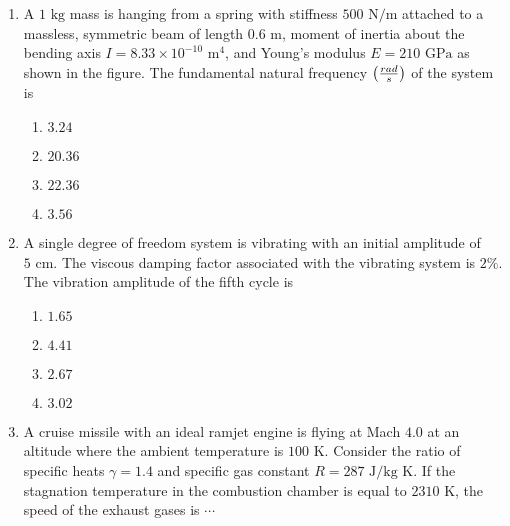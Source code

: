 \documentclass[journal,12pt,twocolumn]{IEEEtran}
\theoremstyle{remark}
\begin{document}
\begin{enumerate}[start=40]
    \item A $1 \text{ kg}$ mass is hanging from a spring with stiffness $500 \text{ N/m}$ attached to a massless, symmetric beam of length $0.6 \text{ m}$, moment of inertia about the bending axis $I = 8.33 \times 10^{-10} \text{ m}^4$, and Young's modulus $E = 210 \text{ GPa}$ as shown in the figure. The fundamental natural frequency $\left(\frac{rad}{s}\right)$ of the system is


	    \begin{enumerate}
        \item $3.24$
        \item $20.36$
        \item $22.36$
        \item $3.56$
    \end{enumerate}

    \item A single degree of freedom system is vibrating with an initial  amplitude of $5 \text{ cm}$. The viscous damping factor associated with the vibrating system is $2\%$. The vibration amplitude of the fifth cycle  is
    \begin{enumerate}
        \item $1.65$
        \item $4.41$
        \item $2.67$
        \item $3.02$
    \end{enumerate}

    \item A cruise missile with an ideal ramjet engine is flying at Mach $4.0$ at an altitude where the ambient temperature is $100 \text{ K}$. Consider the ratio of specific heats $\gamma = 1.4$ and specific gas constant $R = 287 \text{ J/kg K}$. If the stagnation temperature in the combustion chamber is equal to $2310 \text{ K}$, the speed of the exhaust gases  is $\cdots$


\end{enumerate}
\end{document}
